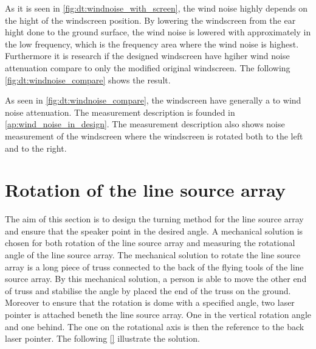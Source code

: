 
As it is seen in \autoref{fig:dt:windnoise_with_screen}, the wind noise highly depends on the hight of the windscreen position. By lowering the windscreen from the ear hight done to the ground surface, the wind noise is lowered with approximately  in the low frequency, which is the frequency area where the wind noise is highest. Furthermore it is research if the designed windscreen have hgiher wind noise attenuation compare to only the modified original windscreen. The following \autoref{fig:dt:windnoise_compare} shows the result.
 

As seen in \autoref{fig:dt:windnoise_compare}, the windscreen have generally a  to  wind noise attenuation. The measurement description is founded in \autoref{ap:wind_noise_in_design}. The measurement description also shows noise measurement of the windscreen where the windscreen is rotated both to the left and to the right. 




\section{Rotation of the line source array}
The aim of this section is to design the turning method for the line source array and ensure that the speaker point in the desired angle. A mechanical solution is chosen for both rotation of the line source array and measuring the rotational angle of the line source array. The mechanical solution to rotate the line source array is a long piece of truss connected to the back of the flying tools of the line source array. By this mechanical solution, a person is able to move the other end of truss and stabilise the angle by placed the end of the truss on the ground. Moreover to ensure that the rotation is dome with a specified angle, two laser pointer is attached beneth the line source array. One in the vertical rotation angle and one behind. The one on the rotational axis is then the reference to the back laser pointer. The following \autoref{} illustrate the solution.


